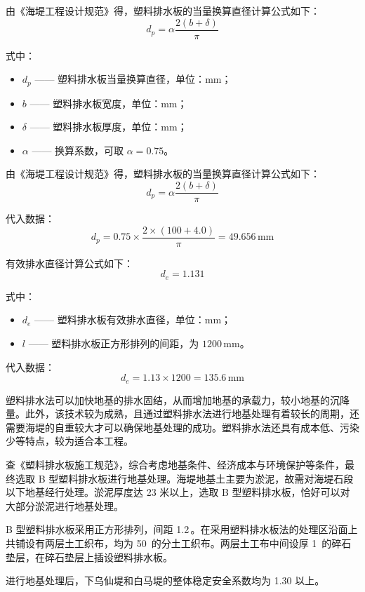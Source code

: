 \documentclass[UTF8, a4paper, 12pt]{ctexart} %
\begin{document}
由《海堤工程设计规范》得，塑料排水板的当量换算直径计算公式如下：
\begin{equation}
    d_p = \alpha \frac{2(b + \delta)}{\pi}
\end{equation}

式中：
\begin{itemize}
    \item $d_p$ —— 塑料排水板当量换算直径，单位：$\text{mm}$；
    \item $b$ —— 塑料排水板宽度，单位：$\text{mm}$；
    \item $\delta$ —— 塑料排水板厚度，单位：$\text{mm}$；
    \item $\alpha$ —— 换算系数，可取 $\alpha = 0.75$。
\end{itemize}
由《海堤工程设计规范》得，塑料排水板的当量换算直径计算公式如下：
\begin{equation}
    d_p = \alpha \frac{2(b + \delta)}{\pi}
\end{equation}

代入数据：
\[
    d_p = 0.75 \times \frac{2 \times (100 + 4.0)}{\pi} = 49.656\,\text{mm}
\]

有效排水直径计算公式如下：
\[
    d_e = 1.131
\]

式中：
\begin{itemize}
    \item $d_e$ —— 塑料排水板有效排水直径，单位：$\text{mm}$；
    \item $l$ —— 塑料排水板正方形排列的间距，为 $1200\,\text{mm}$。
\end{itemize}

代入数据：
\[
    d_e = 1.13 \times 1200 = 135.6\,\text{mm}
\]



塑料排水法可以加快地基的排水固结，从而增加地基的承载力，较小地基的沉降量。此外，该技术较为成熟，且通过塑料排水法进行地基处理有着较长的周期，还需要海堤的自重较大才可以确保地基处理的成功。塑料排水法还具有成本低、污染少等特点，较为适合本工程。

查《塑料排水板施工规范》，综合考虑地基条件、经济成本与环境保护等条件，最终选取 B 型塑料排水板进行地基处理。海堤地基土主要为淤泥，故需对海堤石段以下地基经行处理。淤泥厚度达 23 米以上，选取 B 型塑料排水板，恰好可以对大部分淤泥进行地基处理。

B 型塑料排水板采用正方形排列，间距 1.2\,。在采用塑料排水板法的处理区沿面上共铺设有两层土工织布，均为 50\, 的分土工织布。两层土工布中间设厚 1\, 的碎石垫层，在碎石垫层上插设塑料排水板。

进行地基处理后，下乌仙堤和白马堤的整体稳定安全系数均为 1.30 以上。
\end{document}
